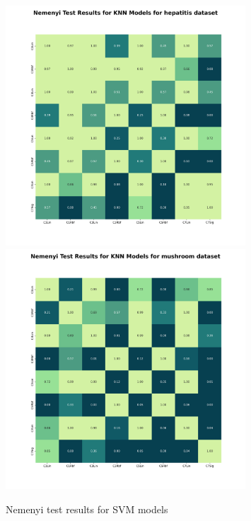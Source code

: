 \begin{figure}[!ht]
    \centering
    \includegraphics[width=0.8\textwidth]{figures/nemenyi_test_results_SVM_hepatitis.png}
    \includegraphics[width=0.8\textwidth]{figures/nemenyi_test_results_SVM_mushroom.png}
    \caption{Nemenyi test results for SVM models}
\label{fig:nemenyi-svm}
\end{figure}

